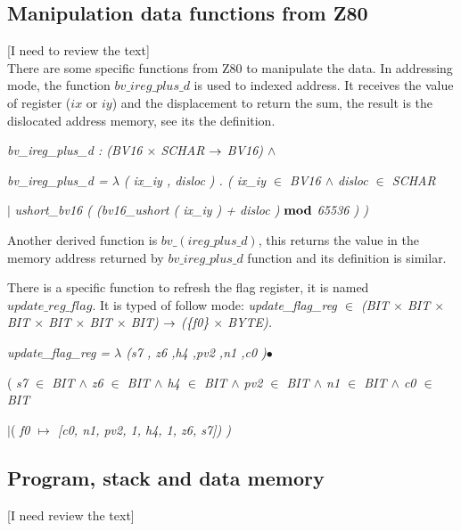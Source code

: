 \documentclass[11pt]{article} %
\begin{document}
\subsection{Manipulation data functions from Z80}
[I need to review the text]\\ There are some specific functions
from Z80 to manipulate the data. In addressing mode, the function $\mathit{bv\_ireg\_plus\_d}$ is  used to indexed address. It receives the
value of register ($\mathit{ix}$ or $\mathit{iy}$) and the displacement to return the sum, the result is the dislocated address memory, see
its the definition.

\hspace*{0.0in}\it bv\_ireg\_plus\_d \rm : \rm(\it BV16  $\times$  \it SCHAR  $\fun$  \it BV16\rm )  $\land$ 

\hspace*{0.0in}\it bv\_ireg\_plus\_d \rm =  $\lambda$  \rm ( \it ix\_iy \rm , \it disloc \rm ) \rm . \rm ( \it ix\_iy  $\in$  \it BV16  $\land$  \it disloc  $\in$  \it SCHAR   

\hspace*{0.20in}$\mid$ \it ushort\_bv16 \rm ( \rm (\it bv16\_ushort \rm ( \it ix\_iy \rm ) \rm + \it disloc \rm ) 
$\mod$ \rm 6\rm 5\rm 5\rm 3\rm 6 \rm ) \rm )

Another derived function is  $\mathit{bv\_(ireg\_plus\_d)}$, this returns the value in the memory  address
returned by $\mathit{bv\_ireg\_plus\_d}$ function and its definition is similar.

There is a specific function to refresh the flag register, it is named $\mathit{update\_reg\_flag}$. It is typed of
follow mode: \it update\_flag\_reg \rm $\in$ \rm (\it BIT  $\times$  \it BIT  $\times$  \it BIT  $\times$  \it
BIT $\times$  \it BIT  $\times$  \it BIT\rm) $\fun$  \rm (\rm \{\it f0\rm \}  $\times$  \it BYTE\rm ). 

\it update\_flag\_reg \rm =  $\lambda$  \rm (\it s7 \rm, \it z6 \rm,\it h4 \rm,\it pv2 \rm ,\it n1
\rm ,\it c0 \rm)$\bullet$

\rm ( \it s7 $\in$ \it BIT $\land$ \it z6 $\in$ \it BIT $\land$ \it h4 $\in$ \it
BIT $\land$ \it pv2 $\in$ \it BIT $\land$ \it n1 $\in$ \it BIT $\land$ \it c0 $\in$ \it BIT
  
\hspace*{0.20in}\rm $\mid$( \it f0  $\mapsto$  \rm \rm [\it c0\rm , \it n1\rm , \it pv2\rm , \rm 1\rm , \it
h4\rm , \rm 1\rm , \it z6\rm , \it s7\rm \rm ]\rm ) \rm )


\subsection{Program, stack and data memory}[I need review the text]
\end{document}
